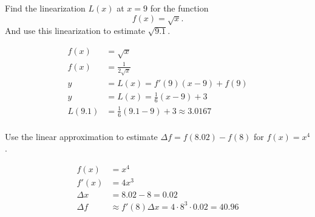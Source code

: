 \documentclass[12pt,addpoints, answers, fleqn]{exam}
\begin{document}
\begin{questions}

\question Find the linearization $L \left(x\right)$ at $x=9$ for the function
\[
f \left(x\right) = \sqrt{x}.
\]
And use this linearization to estimate $\sqrt{9.1}$.

\begin{solution}
\begin{align*}
f\left(x\right) &= \sqrt{x}\\
f\left(x\right) &= \frac{1}{2\sqrt{x}}\\
y  &= L \left(x\right) = f'\left(9\right) \left( x - 9\right)+  f\left(9\right)\\
y  &= L \left(x\right) = \frac{1}{6} \left( x - 9\right)+  3\\
L \left(9.1\right) &= \frac{1}{6} \left( 9.1 - 9\right)+  3 \approx 3.0167\\
\end{align*}
\end{solution}


\question Use the linear approximation to estimate $\Delta f = f\left(8.02\right)  -f\left(8\right)$ for $f\left(x\right) = x^4$.

\begin{solution}
\begin{align*}
f\left(x\right) &= x^4\\
f'\left(x\right) &= 4x^3\\
\Delta x &= 8.02 -8 = 0.02\\
\Delta f & \approx f' \left(8\right) \Delta x = 4 \cdot 8^3 \cdot 0.02 = 40.96
\end{align*}
\end{solution}




\end{questions}
\end{document}
